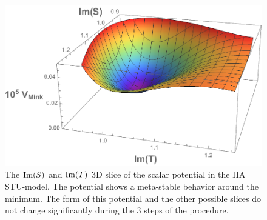 \documentclass[a4paper,12pt]{report}
\def\rmim{{\rm Im}}
\begin{document}
\begin{figure}[H]\hskip 2cm
\includegraphics[scale=0.6]{3Mod3DLarge.pdf}
\caption{ The $\rmim(S)$ and $\rmim(T)$ 3D slice of the scalar potential in the IIA STU-model. The potential shows a meta-stable behavior around the minimum. The form of this  potential and the other possible slices do not change significantly during the 3 steps of the procedure.}
\label{fig:stu3Dlarge}
\end{figure}
\end{document}
